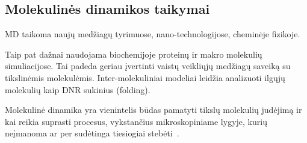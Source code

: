 \subsection{Molekulinės dinamikos taikymai}
\label{sec:molecular_dynamics_applications}

MD taikoma naujų medžiagų tyrimuose, nano-technologijose, cheminėje fizikoje.

Taip pat dažnai naudojama biochemijoje proteinų ir makro molekulių simuliacijose.
Tai padeda geriau įvertinti vaistų veikliųjų medžiagų saveiką su tikslinėmis molekulėmis.
Inter-molekuliniai modeliai leidžia analizuoti ilgųjų molekulių kaip DNR sukinius (folding).

Molekulinė dinamika yra vienintelis būdas pamatyti tikslų molekulių judėjimą ir kai reikia suprasti procesus,
vykstančius mikroskopiniame lygyje, kurių neįmanoma ar per sudėtinga tiesiogiai stebėti~\cite{art}.

